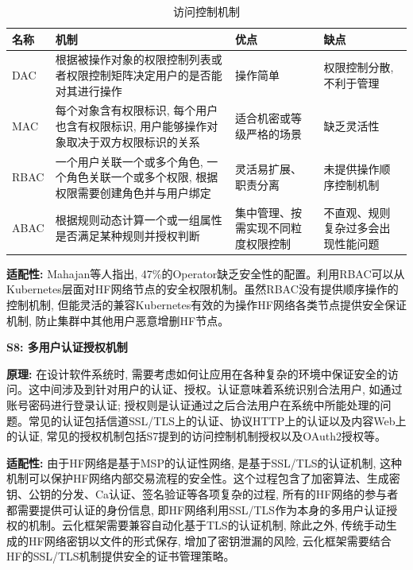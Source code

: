 {\footnotesize
\begin{longtable}[h]{m{20pt} m{200pt} m{60pt} m{60pt}}
    \caption[访问控制机制]{访问控制机制} \label{access_control} \\
        \toprule  
        \textbf{名称}&\textbf{机制}&\textbf{优点}&\textbf{缺点}\\
        \hline
        DAC & 根据被操作对象的权限控制列表或者权限控制矩阵决定用户的是否能对其进行操作 & 操作简单 & 权限控制分散, 不利于管理 \\

        MAC & 每个对象含有权限标识, 每个用户也含有权限标识, 用户能够操作对象取决于双方权限标识的关系 & 适合机密或等级严格的场景 & 缺乏灵活性 \\

        RBAC & 一个用户关联一个或多个角色, 一个角色关联一个或多个权限, 根据权限需要创建角色并与用户绑定 & 灵活易扩展、职责分离 & 未提供操作顺序控制机制 \\

        ABAC & 根据规则动态计算一个或一组属性是否满足某种规则并授权判断 & 集中管理、按需实现不同粒度权限控制 & 不直观、规则复杂过多会出现性能问题 \\
        \bottomrule
    \end{longtable}
}

\textbf{适配性: }Mahajan等人\cite{mahajan2020suture}指出, 47\%的Operator缺乏安全性的配置。利用RBAC可以从Kubernetes层面对HF网络节点的安全权限机制。虽然RBAC没有提供顺序操作的控制机制, 但能灵活的兼容Kubernetes有效的为操作HF网络各类节点提供安全保证机制, 防止集群中其他用户恶意增删HF节点。

\textbf{S8: 多用户认证授权机制}

\textbf{原理: }在设计软件系统时, 需要考虑如何让应用在各种复杂的环境中保证安全的访问。这中间涉及到针对用户的认证、授权。认证意味着系统识别合法用户, 如通过账号密码进行登录认证; 授权则是认证通过之后合法用户在系统中所能处理的问题。常见的认证包括信道SSL/TLS上的认证、协议HTTP上的认证以及内容Web上的认证, 常见的授权机制包括S7提到的访问控制机制授权以及OAuth2授权等。

\textbf{适配性: }由于HF网络是基于MSP的认证性网络, 是基于SSL/TLS的认证机制, 这种机制可以保护HF网络内部交易流程的安全性。这个过程包含了加密算法、生成密钥、公钥的分发、Ca认证、签名验证等各项复杂的过程, 所有的HF网络的参与者都需要提供可认证的身份信息, 即HF网络利用SSL/TLS作为本身的多用户认证授权的机制。云化框架需要兼容自动化基于TLS的认证机制, 除此之外, 传统手动生成的HF网络密钥以文件的形式保存, 增加了密钥泄漏的风险, 云化框架需要结合HF的SSL/TLS机制提供安全的证书管理策略。

